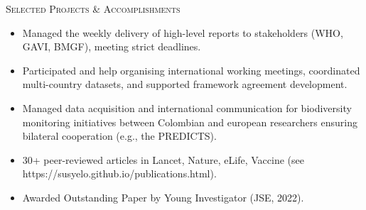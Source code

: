 \documentclass[9pt, a4paper]{article}
\newcommand{\headright}[1]{\vspace*{2.5ex}\textsc{\Large\color{cvblue}#1}\par%
     \vspace*{-2ex}{\color{cvblue}\hrulefill}\par}
\begin{document}
\begin{minipage}[t]{0.56\textwidth}
\headright{Selected Projects \& Accomplishments}

\begin{itemize}
\item Managed the weekly delivery of high-level reports to stakeholders (WHO, GAVI, BMGF), meeting strict deadlines.
\item Participated and help organising international working meetings, coordinated multi-country datasets, and supported framework agreement development.
\item Managed data acquisition and international communication for biodiversity monitoring initiatives between Colombian and european researchers ensuring bilateral cooperation (e.g., the PREDICTS).
\item 30+ peer-reviewed articles in Lancet, Nature, eLife, Vaccine (see https://susyelo.github.io/publications.html).
\item Awarded Outstanding Paper by Young Investigator (JSE, 2022).
\end{itemize}


%
%
%
%
%
%
%


\end{minipage}
\end{document}
